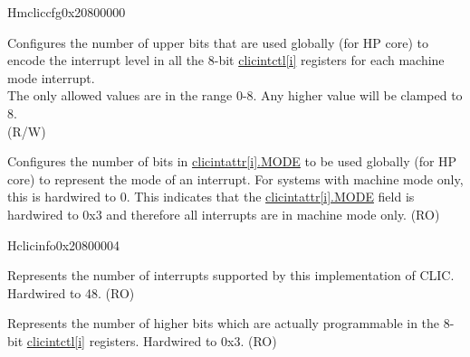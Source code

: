 \begin{register}{H}{{mcliccfg}}{0x20800000}\label{regdesc:MCLICCFG_REG}
%
%
%
\regnewline%
\begin{regdesc}
\begin{reglist}
\label{fielddesc:MCLICCFG_MNLBITS}\item [MNLBITS] Configures the number of upper bits that are used globally (for HP core) to encode the interrupt level in all the 8-bit \hyperref[regdesc:MCLICINTCTL_REG_i]{clicintctl[i]} registers for each machine mode interrupt.\\
The only allowed values are in the range 0-8. Any higher value will be clamped to 8. \\
(R/W)
\label{fielddesc:MCLICCFG_NMBITS}\item [NMBITS] Configures the number of bits in \hyperref[fielddesc:MCLICINTATTR_i_MODE]{clicintattr[i].MODE} to be used globally (for HP core) to represent the mode of an interrupt. For systems with machine mode only, this is hardwired to 0. This indicates that the \hyperref[fielddesc:MCLICINTATTR_i_MODE]{clicintattr[i].MODE} field is hardwired to 0x3 and therefore all interrupts are in machine mode only. (RO) \\
\end{reglist}
\end{regdesc}
\end{register}


\begin{register}{H}{{clicinfo}}{0x20800004}\label{regdesc:CLICINFO_REG}
%
%
%
%
\regnewline%
\begin{regdesc}
\begin{reglist}
\label{fielddesc:CLICINFO_NUM_INTERRUPTS}\item [NUM\_INTERRUPTS] Represents the number of interrupts supported by this implementation of CLIC. Hardwired to 48. (RO)
\label{fielddesc:CLICINFO_CLICINTCTLBITS}\item [CLICINTCTLBITS] Represents the number of higher bits which are actually programmable in the 8-bit \hyperref[regdesc:MCLICINTCTL_REG_i]{clicintctl[i]} registers. Hardwired to 0x3. (RO)
\end{reglist}
\end{regdesc}
\end{register}


